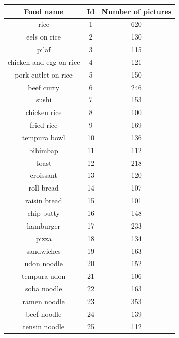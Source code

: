 {
    \begin{longtable}{| c | c | c|}
        \hline
        \textbf{Food name} & \textbf{Id} & \textbf{Number of pictures} \\
        \hline
        \hline
        \endhead
        rice  &  1  &  620  \\
        \hline
        eels on rice  &  2  &  130  \\
        \hline
        pilaf  &  3  &  115  \\
        \hline
        chicken and egg on rice  &  4  &  121  \\
        \hline
        pork cutlet on rice  &  5  &  150  \\
        \hline
        beef curry  &  6  &  246  \\
        \hline
        sushi  &  7  &  153  \\
        \hline
        chicken rice  &  8  &  100  \\
        \hline
        fried rice  &  9  &  169  \\
        \hline
        tempura bowl  &  10  &  136  \\
        \hline
        bibimbap  &  11  &  112  \\
        \hline
        toast  &  12  &  218  \\
        \hline
        croissant  &  13  &  120  \\
        \hline
        roll bread  &  14  &  107  \\
        \hline
        raisin bread  &  15  &  101  \\
        \hline
        chip butty  &  16  &  148  \\
        \hline
        hamburger  &  17  &  233  \\
        \hline
        pizza  &  18  &  134  \\
        \hline
        sandwiches  &  19  &  163  \\
        \hline
        udon noodle  &  20  &  152  \\
        \hline
        tempura udon  &  21  &  106  \\
        \hline
        soba noodle  &  22  &  163  \\
        \hline
        ramen noodle  &  23  &  353  \\
        \hline
        beef noodle  &  24  &  139  \\
        \hline
        tensin noodle  &  25  &  112  \\

\end{longtable}}
